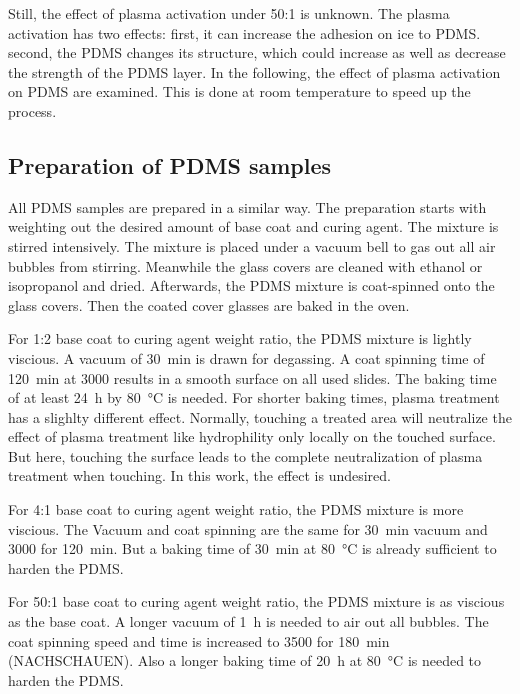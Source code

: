 Still, the effect of plasma activation under 50:1 is unknown. The plasma activation has two effects: first, it can increase the adhesion on ice to PDMS. second, the PDMS changes its structure, which could increase as well as decrease the strength of the PDMS layer. In the following, the effect of plasma activation on PDMS are examined. This is done at room temperature to speed up the process.

\subsection{Preparation of PDMS samples}

All PDMS samples are prepared in a similar way. The preparation starts with weighting out the desired amount of base coat and curing agent. The mixture is stirred intensively. The mixture is placed under a vacuum bell to gas out all air bubbles from stirring. Meanwhile the glass covers are cleaned with ethanol or isopropanol and dried. Afterwards, the PDMS mixture is coat-spinned onto the glass covers. Then the coated cover glasses are baked in the oven.

For 1:2 base coat to curing agent weight ratio, the PDMS mixture is lightly viscious. A vacuum of \SI{30}{\minute} is drawn for degassing. A coat spinning time of \SI{120}{\minute} at \SI{3000}{\rpm} results in a smooth surface on all used slides. The baking time of at least \SI{24}{\hour} by \SI{80}{\degreeCelsius} is needed. For shorter baking times, plasma treatment has a slighlty different effect. Normally, touching a treated area will neutralize the effect of plasma treatment like hydrophility only locally on the touched surface. But here, touching the surface leads to the complete neutralization of plasma treatment when touching. In this work, the effect is undesired.
 
For 4:1 base coat to curing agent weight ratio, the PDMS mixture is more viscious. The Vacuum and coat spinning are the same for \SI{30}{\minute} vacuum and \SI{3000}{\rpm} for \SI{120}{\minute}. But a baking time of \SI{30}{\minute} at \SI{80}{\degreeCelsius} is already sufficient to harden the PDMS. 

For 50:1 base coat to curing agent weight ratio, the PDMS mixture is as viscious as the base coat. A longer vacuum of \SI{1}{\hour} is needed to air out all bubbles. The coat spinning speed and time is increased to \SI{3500}{\rpm} for \SI{180}{\minute} (NACHSCHAUEN). Also a longer baking time of \SI{20}{\hour} at \SI{80}{\degreeCelsius} is needed to harden the PDMS. 

